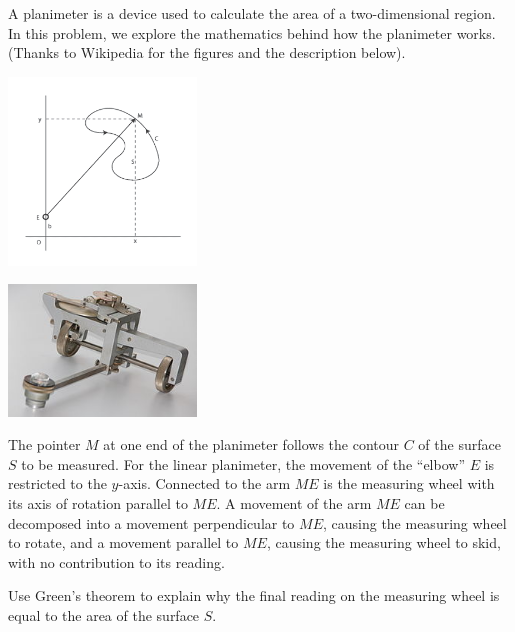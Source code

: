 \documentclass{watsonbook}
\begin{document}
\begin{aexercise}
  A planimeter is a device used to calculate the area of a
  two-dimensional region. In this problem, we explore the mathematics
  behind how the planimeter works. (Thanks to Wikipedia for the
  figures and the description below).

  \begin{center}
    \begin{minipage}{5cm}
      \includegraphics[width=5cm]{exercisefigures/planfig}
    \end{minipage}
    \begin{minipage}{5cm}
      \includegraphics[width=5cm]{exercisefigures/planimeter.jpg}
    \end{minipage}
  \end{center}

  The pointer $M$ at one end of the planimeter follows the contour $C$
  of the surface $S$ to be measured. For the linear planimeter, the
  movement of the ``elbow'' $E$ is restricted to the
  $y$-axis. Connected to the arm $ME$ is the measuring wheel with its
  axis of rotation parallel to $ME$. A movement of the arm $ME$ can be
  decomposed into a movement perpendicular to $ME$, causing the
  measuring wheel to rotate, and a movement parallel to $ME$, causing
  the measuring wheel to skid, with no contribution to its reading.

  Use Green's theorem to explain why the final reading on the
  measuring wheel is equal to the area of the surface $S$.
\end{aexercise}

\end{document}

